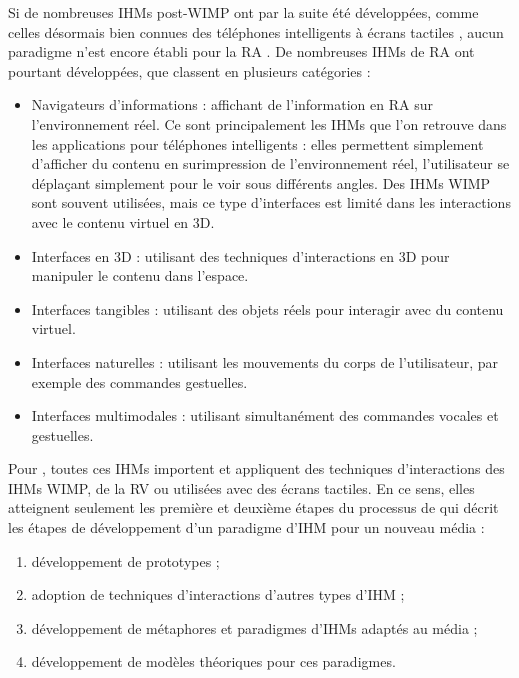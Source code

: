 Si de nombreuses IHMs post-WIMP ont par la suite été développées, comme celles désormais bien connues des téléphones intelligents à écrans tactiles \cite{Jacob2008}, aucun paradigme n'est encore établi pour la RA \citep{VanKrevelen2010}. De nombreuses IHMs de RA ont pourtant développées, que \cite{Billinghurst2015} classent en plusieurs catégories :
\begin{itemize}
  \item Navigateurs d'informations : affichant de l'information en RA sur l'environnement réel. Ce sont principalement les IHMs que l'on retrouve dans les applications pour téléphones intelligents  : elles permettent simplement d'afficher du contenu en surimpression de l'environnement réel, l'utilisateur se déplaçant simplement pour le voir sous différents angles. Des IHMs WIMP sont souvent utilisées, mais ce type d'interfaces est limité dans les interactions avec le contenu virtuel en 3D.
  \item Interfaces en 3D : utilisant des techniques d'interactions en 3D pour manipuler le contenu dans l'espace.
  \item Interfaces tangibles : utilisant des objets réels pour interagir avec du contenu virtuel.
  \item Interfaces naturelles : utilisant les mouvements du corps de l'utilisateur, par exemple des commandes gestuelles.
  \item Interfaces multimodales : utilisant simultanément des commandes vocales et gestuelles.
\end{itemize}
\medskip

Pour \cite{Billinghurst2015}, toutes ces IHMs importent et appliquent des techniques d'interactions des IHMs WIMP, de la RV ou utilisées avec des écrans tactiles. En ce sens, elles atteignent seulement les première et deuxième étapes du processus de \cite{Billinghurst2005} qui décrit les étapes de développement d'un paradigme d'IHM pour un nouveau média :
\begin{enumerate}
  \item développement de prototypes ;
  \item adoption de techniques d'interactions d'autres types d'IHM ;
  \item développement de métaphores et paradigmes d'IHMs adaptés au média ;
  \item développement de modèles théoriques pour ces paradigmes.
\end{enumerate}
\medskip

